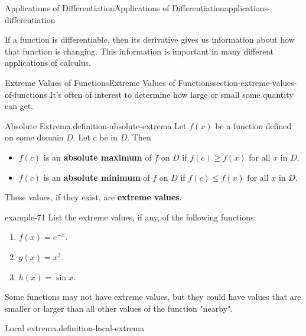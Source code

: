 \documentclass[oneside,10pt,]{book}
\newcommand{\terminology}[1]{\textbf{#1}}
\numberwithin{equation}{section}
\begin{document}
\begin{chapterptx}{Applications of Differentiation}{}{Applications of Differentiation}{}{}{applications-differentiation}
\begin{introduction}{}%
\hypertarget{p-308}{}%
If a function is differentiable, then its derivative gives us information about how that function is changing. This information is important in many different applications of calculus.%
\end{introduction}%
%
%
\typeout{************************************************}
\typeout{************************************************}
%
\begin{sectionptx}{Extreme Values of Functions}{}{Extreme Values of Functions}{}{}{section-extreme-values-of-functions}
\hypertarget{p-309}{}%
It's often of interest to determine how large or small some quantity can get.%
\begin{definition}{Absolute Extrema.}{definition-absolute-extrema}%
\hypertarget{p-310}{}%
Let \(f(x)\) be a function defined on some domain \(D\). Let \(c\) be in \(D\). Then\leavevmode%
\begin{itemize}[label=\textbullet]
\item{}\(f(c)\) is an \terminology{absolute maximum} of \(f\) on \(D\) if \(f(c)\geq f(x)\) for all \(x\) in \(D\).%
\item{}\(f(c)\) is an \terminology{absolute minimum} of \(f\) on \(D\) if \(f(c)\leq f(x)\) for all \(x\) in \(D\).%
\end{itemize}
These values, if they exist, are \terminology{extreme values}.%
\end{definition}
\begin{example}{}{example-71}%
\hypertarget{p-311}{}%
List the extreme values, if any, of the following functions:\leavevmode%
\begin{enumerate}
\item\hypertarget{li-19}{}\(f(x) = e^{-x}\).%
\item\hypertarget{li-20}{}\(g(x) = x^{2}\).%
\item\hypertarget{li-21}{}\(h(x) = \sin x\).%
\end{enumerate}
%
\end{example}
\hypertarget{p-312}{}%
Some functions may not have extreme values, but they could have values that are smaller or larger than all other values of the function "nearby".%
\begin{definition}{Local extrema.}{definition-local-extrema}%

\end{definition}
\end{sectionptx}
\end{chapterptx}
\end{document}
